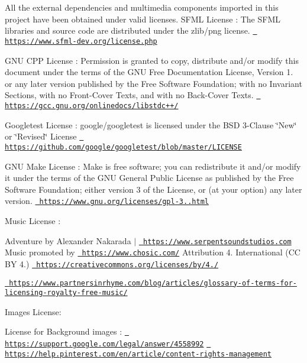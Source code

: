 All the external dependencies and multimedia components imported in this project have been obtained under valid licenses. 
 SFML License \+: The SFML libraries and source code are distributed under the zlib/png license. \href{https://www.sfml-dev.org/license.php}{\texttt{ https\+://www.\+sfml-\/dev.\+org/license.\+php}} 


GNU CPP License \+: Permission is granted to copy, distribute and/or modify this document under the terms of the GNU Free Documentation License, Version 1. or any later version published by the Free Software Foundation; with no Invariant Sections, with no Front-\/\+Cover Texts, and with no Back-\/\+Cover Texts. \href{https://gcc.gnu.org/onlinedocs/libstdc++/}{\texttt{ https\+://gcc.\+gnu.\+org/onlinedocs/libstdc++/}} 


Googletest License \+: google/googletest is licensed under the BSD 3-\/Clause \char`\"{}\+New\char`\"{} or \char`\"{}\+Revised\char`\"{} License \href{https://github.com/google/googletest/blob/master/LICENSE}{\texttt{ https\+://github.\+com/google/googletest/blob/master/\+LICENSE}} 


GNU Make License \+: Make is free software; you can redistribute it and/or modify it under the terms of the GNU General Public License as published by the Free Software Foundation; either version 3 of the License, or (at your option) any later version. \href{https://www.gnu.org/licenses/gpl-3.0.html}{\texttt{ https\+://www.\+gnu.\+org/licenses/gpl-\/3..\+html}} 


Music License \+:

Adventure by Alexander Nakarada $\vert$ \href{https://www.serpentsoundstudios.com}{\texttt{ https\+://www.\+serpentsoundstudios.\+com}} Music promoted by \href{https://www.chosic.com/}{\texttt{ https\+://www.\+chosic.\+com/}} Attribution 4. International (CC BY 4.) \href{https://creativecommons.org/licenses/by/4.0/}{\texttt{ https\+://creativecommons.\+org/licenses/by/4./}}

\href{https://www.partnersinrhyme.com/blog/articles/glossary-of-terms-for-licensing-royalty-free-music/}{\texttt{ https\+://www.\+partnersinrhyme.\+com/blog/articles/glossary-\/of-\/terms-\/for-\/licensing-\/royalty-\/free-\/music/}} 


Images License\+:

License for Background images \+: \href{https://support.google.com/legal/answer/4558992}{\texttt{ https\+://support.\+google.\+com/legal/answer/4558992}} \href{https://help.pinterest.com/en/article/content-rights-management}{\texttt{ https\+://help.\+pinterest.\+com/en/article/content-\/rights-\/management}}

